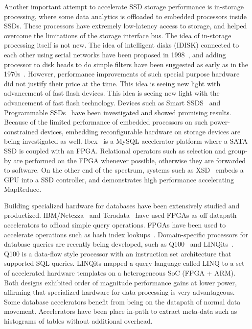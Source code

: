 Another important attempt to accelerate SSD storage performance is in-storage
processing, where some data analytics is offloaded to embedded processors inside
SSDs. These processors have extremely low-latency access to storage, and helped
overcome the limitations of the storage interface bus. The idea of in-storage
processing itself is not new. The idea of intelligent disks (IDISK) connected to
each other using serial networks have been proposed in 1998~\cite{idisk}, and
adding processor to disk heads to do simple filters have been suggested as early
as in the 1970s~\cite{?,?,?}. However, performance improvements of such special
purpose hardware did not justify their price at the time. This idea is seeing
new light with advancement of fast flash devices. This idea is seeing new light
with the advancement of fast flash technology. Devices such as Smart
SSDS~\cite{smartssdquery,smartssdcost,ucsd_willow} and Programmable
SSDs~\cite{xsd} have been investigated and showed promising results. Because of
the limited performance of embedded processors on such power-constrained
devices, embedding reconfigurable hardware on storage devices are being
investigated as well. Ibex~\cite{ibex} is a MySQL accelerator platform where a
SATA SSD is coupled with an FPGA. Relational operators such as selection and
group-by are performed on the FPGA whenever possible, otherwise they are
forwarded to software. On the other end of the spectrum, systems such as
XSD~\cite{xsd} embeds a GPU into a SSD controller, and demonstrates high
performance accelerating MapReduce.

Building specialized hardware for databases have been extensively studied and
productized. IBM/Netezza~\cite{netezza} and Teradata~\cite{teradata} have used
FPGAs as off-datapath accelerators to offload simple query operations. FPGAs
have been used to accelerate operations such as hash index
lookups~\cite{walkers}. Domain-specific processors for database queries are
recently being developed, such as Q100~\cite{q100} and LINQits~\cite{linqits}.
Q100 is a data-flow style processor with an instruction set architecture that
supported SQL queries. LINQits mapped a query language called LINQ to a set of
accelerated hardware templates on a heterogeneous SoC (FPGA + ARM). Both designs
exhibited order of magnitude performance gains at lower power, affirming that
specialized hardware for data processing is very advantageous.
Some database accelerators benefit from being on the datapath of normal data
movement. Accelerators have been place in-path to extract meta-data such as
histograms of tables without additional overhead.

